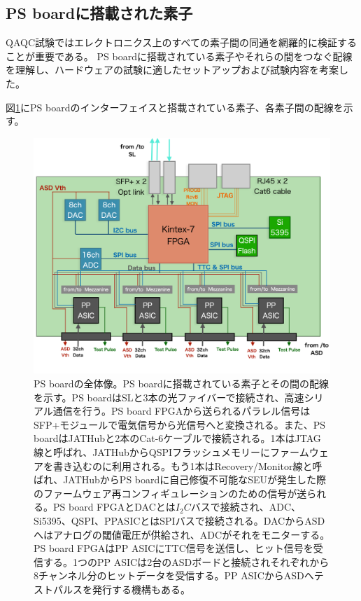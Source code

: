 \newpage
\subsection{PS boardに搭載された素子}
\label{subsec_PSBelements}
QAQC試験ではエレクトロニクス上のすべての素子間の同通を網羅的に検証することが重要である。
PS boardに搭載されている素子やそれらの間をつなぐ配線を理解し、ハードウェアの試験に適したセットアップおよび試験内容を考案した。

図\ref{PSBconcept}にPS boardのインターフェイスと搭載されている素子、各素子間の配線を示す。

\begin{figure} 
\centering
\includegraphics[width=16cm]{fig/QAQC/PSBoverall.png}
\caption[PSboardの全体像]{PS boardの全体像。PS boardに搭載されている素子とその間の配線を示す。PS boardはSLと3本の光ファイバーで接続され、高速シリアル通信を行う。PS board FPGAから送られるパラレル信号はSFP+モジュールで電気信号から光信号へと変換される。また、PS boardはJATHubと2本のCat-6ケーブルで接続される。1本はJTAG線と呼ばれ、JATHubからQSPIフラッシュメモリーにファームウェアを書き込むのに利用される。もう1本はRecovery/Monitor線と呼ばれ、JATHubからPS boardに自己修復不可能なSEUが発生した際のファームウェア再コンフィギュレーションのための信号が送られる。PS board FPGAとDACとは$I_{2}C$バスで接続され、ADC、Si5395、QSPI、PPASICとはSPIバスで接続される。DACからASDへはアナログの閾値電圧が供給され、ADCがそれをモニターする。PS board FPGAはPP ASICにTTC信号を送信し、ヒット信号を受信する。1つのPP ASICは2台のASDボードと接続されそれぞれから8チャンネル分のヒットデータを受信する。PP ASICからASDへテストパルスを発行する機構もある。}
\label{PSBconcept}
\end{figure}


